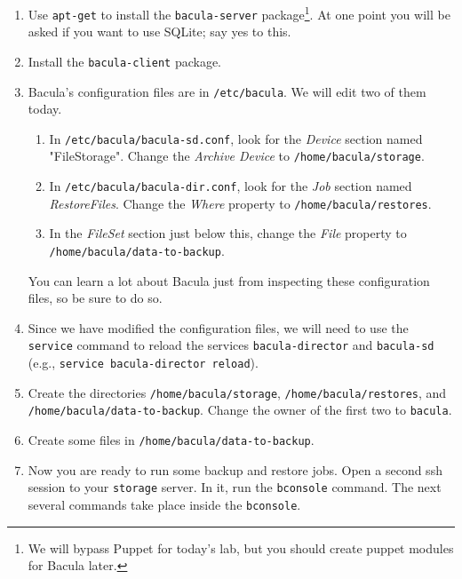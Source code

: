 \documentclass{article}   	%
\begin{document}
\begin{enumerate}
  \item Use \texttt{apt-get} to install the \texttt{bacula-server} package\footnote{We will bypass Puppet for today's lab, but you should create puppet modules for Bacula later.}.  At one point you will be asked if you want to use SQLite; say yes to this.  

  \item Install the \texttt{bacula-client} package.

  \item Bacula's configuration files are in \texttt{/etc/bacula}. We will edit two of them today.
        \begin{enumerate}
            \item In \texttt{/etc/bacula/bacula-sd.conf}, look for the \emph{Device} section named "FileStorage".  Change the \emph{Archive Device} to 
	          \texttt{/home/bacula/storage}.

	    \item In \texttt{/etc/bacula/bacula-dir.conf}, look for the \emph{Job} section named \emph{RestoreFiles}.  Change the \emph{Where} property
	          to \texttt{/home/bacula/restores}.

	    \item In the \emph{FileSet} section just below this, change the \emph{File} property to \texttt{/home/bacula/data-to-backup}.
	\end{enumerate}

	You can learn a lot about Bacula just from inspecting these configuration files, so be sure to do so.

  \item Since we have modified the configuration files, we will need to use the \texttt{service} command to reload the services 
        \texttt{bacula-director} and \texttt{bacula-sd} (e.g., \texttt{service bacula-director reload}).

  \item Create the directories \texttt{/home/bacula/storage}, \texttt{/home/bacula/restores}, and \texttt{/home/bacula/data-to-backup}.
        Change the owner of the first two to \texttt{bacula}.

  \item Create some files in \texttt{/home/bacula/data-to-backup}.

  \item Now you are ready to run some backup and restore jobs.  Open a second ssh session to your \texttt{storage} server. In it, run the 
        \texttt{bconsole} command.  The next several commands take place inside the \texttt{bconsole}.


\end{enumerate}
\end{document}
